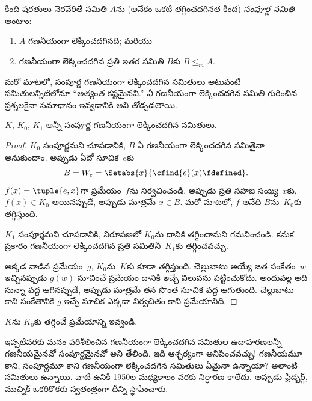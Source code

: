 \documentclass[../../../include/open-logic-section]{subfiles}
\begin{document}

\begin{defn}
కింది షరతులు నెరవేరితే సమితి $A$ను (అనేకం-ఒకటి తగ్గించదగినత కింద)
\emph{సంపూర్ణ  సమితి} అంటాం:
\begin{enumerate}
\item $A$ గణనీయంగా లెక్కించదగినది; మరియు
\item గణనీయంగా లెక్కించదగిన ప్రతి ఇతర సమితి $B$కు $B\leq_m A$.
\end{enumerate}
\end{defn}

మరో మాటలో, సంపూర్ణ గణనీయంగా లెక్కించదగిన సమితులు అటువంటి సమితులన్నిటిలోనూ ``అత్యంత కష్టమైనవి.''
\emph{ఏ} గణనీయంగా లెక్కించదగిన సమితి గురించిన ప్రశ్నలకైనా సమాధానం
ఇవ్వడానికి అవి తోడ్పడతాయి.

\begin{thm}
$K$, $K_0$, $K_1$ అన్నీ సంపూర్ణ గణనీయంగా లెక్కించదగిన సమితులు.
\end{thm}

\begin{proof}
$K_0$ సంపూర్ణమని చూపడానికి, $B$ ఏ గణనీయంగా లెక్కించదగిన సమితైనా
అనుకుందాం. అప్పుడు ఏదో సూచిక~$e$కు
\[
B=W_e=\Setabs{x}{\cfind{e}(x)\fdefined}.
\]
$f(x)=\tuple{e,x}$గా ప్రమేయం~$f$ను నిర్వచించండి. అప్పుడు ప్రతి సహజ
సంఖ్య~$x$కు, $f(x)\in K_0$ అయినప్పుడే, అప్పుడు మాత్రమే $x\in B$. మరో మాటలో, $f$ అనేది
$B$ను~$K_0$కు తగ్గిస్తుంది.

$K_1$ సంపూర్ణమని చూపడానికి,  నిరూపణలో $K_0$ను
దానికి తగ్గించామని గమనించండి. కనుక 
ప్రకారం గణనీయంగా లెక్కించదగిన ప్రతి సమితినీ~$K_1$కు తగ్గించవచ్చు.

అక్కడ వాడిన ప్రమేయం~$g$, $K_0$ను~$K$కు కూడా తగ్గిస్తుంది. చెల్లుబాటు
అయ్యే జత సంకేతం~$w$ ఇచ్చినప్పుడు $g(w)$ సూచించే ప్రమేయం దానికి ఇచ్చే
విలువను పట్టించుకోదు. అందువల్ల అది సున్నా వద్ద ఆగినప్పుడే, అప్పుడు మాత్రమే తన సొంత సూచిక
వద్ద ఆగుతుంది. చెల్లుబాటు కాని సంకేతానికి $g$ ఇచ్చే సూచిక ఎక్కడా
నిర్వచితం కాని ప్రమేయానిది.
\end{proof}

\begin{prob}
$K$ను $K_0$కు తగ్గించే ప్రమేయాన్ని ఇవ్వండి.
\end{prob}

\begin{digress}
ఇప్పటివరకు మనం పరిశీలించిన గణనీయంగా లెక్కించదగిన సమితుల ఉదాహరణలన్నీ
గణనీయమైనవో సంపూర్ణమైనవో అని తేలింది. ఇది ఆశ్చర్యంగా అనిపించవచ్చు!{}
గణనీయమూ కాని, సంపూర్ణమూ కాని గణనీయంగా లెక్కించదగిన సమితులు ఏమైనా
ఉన్నాయా? అలాంటి సమితులు ఉన్నాయి. వాటి ఉనికి 1950ల మధ్యకాలం వరకు నిర్ధారణ కాలేదు. అప్పుడు ఫ్రీడ్బర్గ్,
ముచ్నిక్ ఒకరికొకరు స్వతంత్రంగా దీన్ని స్థాపించారు.
\end{digress}
\end{document}
